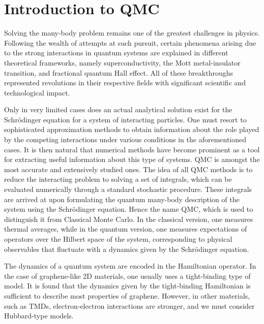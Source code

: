 \section{Introduction to \acl{QMC}}
\label{sec:introQMC}

Solving the many-body problem remains one of the greatest challenges in physics.
Following the wealth of attempts at such pursuit, certain phenomena arising due to the strong interactions in quantum systems are explained in different theoretical frameworks, namely superconductivity, the Mott metal-insulator transition, and fractional quantum Hall effect.
All of these breakthroughs represented revolutions in their respective fields with significant scientific and technological impact.

Only in very limited cases does an actual analytical solution exist for the  Schr\"odinger equation for a system of interacting particles.
One must resort to sophisticated approximation methods to obtain  information about the role played by the competing interactions under various conditions in the aforementioned cases.
It is then natural that numerical methods have become prominent as a tool for extracting useful information about this type of systems.
\ac{QMC} is amongst the most accurate and extensively studied ones.
The idea of all \ac{QMC} methods is to reduce the interacting problem to solving a set of integrals, which can be evaluated numerically through a standard stochastic procedure.
These integrals are arrived at upon formulating the quantum many-body description of the system using the Schr\"odinger equation.
Hence the name \acl{QMC}, which is used to distinguish it from Classical Monte Carlo.
In the classical version, one measures thermal averages, while in the quantum version, one measures expectations of operators over the Hilbert space of the system, corresponding to physical observables that fluctuate with a dynamics given by the Schr\"odinger equation.

The dynamics of a quantum system are encoded in the Hamiltonian operator.
In the case of graphene-like \ac{2D} materials, one usually uses a tight-binding type of model.
It is found that the dynamics given by the tight-binding Hamiltonian is sufficient to describe most properties of graphene.
However, in other materials, such as \acp{TMD}, electron-electron interactions are stronger, and we must consider  Hubbard-type models.

